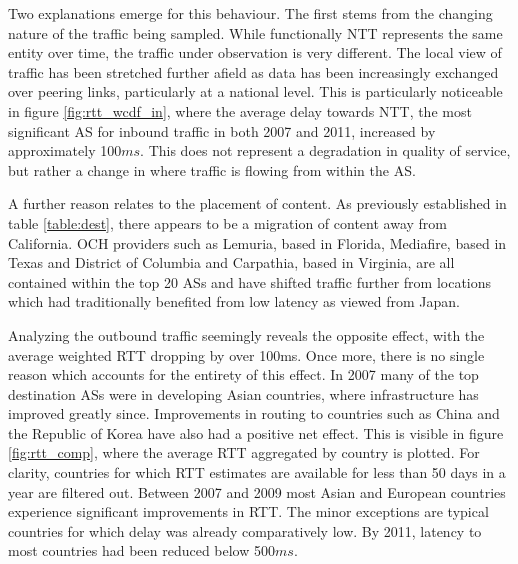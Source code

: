 Two explanations emerge for this behaviour. 
The first stems from the changing nature of the traffic being sampled. 
While functionally \acs{NTT} represents the same entity over time, the traffic under observation is very different. 
The local view of traffic has been stretched further afield as data has been increasingly exchanged over peering links, particularly at a national level.
This is particularly noticeable in figure \ref{fig:rtt_wcdf_in}, where the average delay towards \acs{NTT}, the most significant \ac{AS} for inbound traffic in both 2007 and 2011, increased by approximately 100$ms$.
This does not represent a degradation in quality of service, but rather a change in where traffic is flowing from within the \acs{AS}.

A further reason relates to the placement of content. 
As previously established in table \ref{table:dest}, there appears to be a migration of content away from California. 
\ac{OCH} providers such as Lemuria, based in Florida, Mediafire, based in Texas and District of Columbia and Carpathia, based in Virginia, are all contained within the top 20 \acp{AS} and have shifted traffic further from locations which had traditionally benefited from low latency as viewed from Japan.

Analyzing the outbound traffic seemingly reveals the opposite effect, with the average weighted \ac{RTT} dropping by over 100ms. 
Once more, there is no single reason which accounts for the entirety of this effect. 
In 2007 many of the top destination \acp{AS} were in developing Asian countries, where infrastructure has improved greatly since. 
Improvements in routing to countries such as China and the Republic of Korea have also had a positive net effect. 
This is visible in figure \ref{fig:rtt_comp}, where the average \ac{RTT} aggregated by country is plotted. 
For clarity, countries for which RTT estimates are available for less than 50 days in a year are filtered out. 
Between 2007 and 2009 most Asian and European countries experience significant improvements in \ac{RTT}.
The minor exceptions are typical countries for which delay was already comparatively low.
By 2011, latency to most countries had been reduced below 500$ms$.

